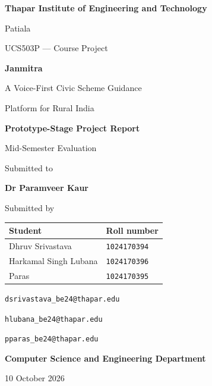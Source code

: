 \documentclass[11pt,a4paper,oneside]{report}
\newcommand{\ReportDate}{10 October 2026}
\newcommand{\Advisor}{Dr Paramveer Kaur}
\begin{document}
\hypersetup{pageanchor=false}
\begin{titlepage}
  \centering
  {\large\bfseries Thapar Institute of Engineering and Technology\par}
  \vspace{0.2cm}
  {\large Patiala\par}
  \vspace{0.9cm}
  {\large UCS503P --- Course Project\par}
  \vspace{1.1cm}
  {\Huge\bfseries Janmitra\par}
  \vspace{0.4cm}
  {\LARGE A Voice-First Civic Scheme Guidance\par
    Platform for Rural India\par}
  \vspace{0.8cm}
  {\Large\bfseries Prototype-Stage Project Report\par}
  \vspace{0.2cm}
  {\large Mid-Semester Evaluation\par}
  \vspace{1.2cm}
  {\large Submitted to\par}
  \vspace{0.15cm}
  {\Large\bfseries \Advisor\par}
  \vspace{1.0cm}
  {\large Submitted by\par}
  \vspace{0.3cm}
  \begin{tabular}{@{}ll@{}}
    \textbf{Student} & \textbf{Roll number} \\
    \midrule
    Dhruv Srivastava & \texttt{1024170394} \\
    Harkamal Singh Lubana & \texttt{1024170396} \\
    Paras & \texttt{1024170395}
  \end{tabular}
  \vspace{0.4cm}
  \par{\small
    \texttt{dsrivastava\_be24@thapar.edu}\par
    \texttt{hlubana\_be24@thapar.edu}\par
    \texttt{pparas\_be24@thapar.edu}\par}
  \vfill
  {\large\bfseries Computer Science and Engineering Department\par}
  \vspace{0.4cm}
  {\large \ReportDate\par}
\end{titlepage}
\end{document}
